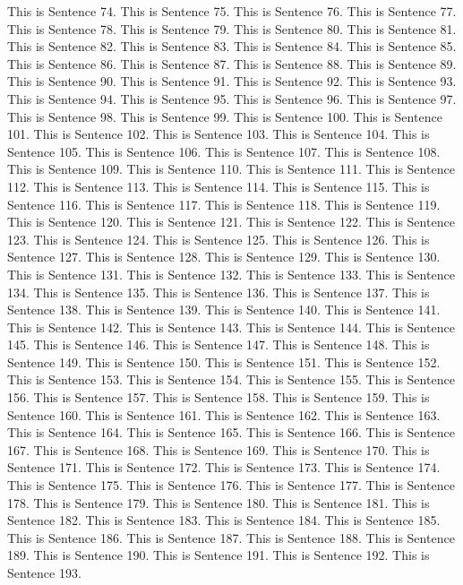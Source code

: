 \documentclass{article}
\begin{document}
This is Sentence 74.
This is Sentence 75.
This is Sentence 76.
This is Sentence 77.
This is Sentence 78.
This is Sentence 79.
This is Sentence 80.
This is Sentence 81.
This is Sentence 82.
This is Sentence 83.
This is Sentence 84.
This is Sentence 85.
This is Sentence 86.
This is Sentence 87.
This is Sentence 88.
This is Sentence 89.
This is Sentence 90.
This is Sentence 91.
This is Sentence 92.
This is Sentence 93.
This is Sentence 94.
This is Sentence 95.
This is Sentence 96.
This is Sentence 97.
This is Sentence 98.
This is Sentence 99.
This is Sentence 100.
This is Sentence 101.
This is Sentence 102.
This is Sentence 103.
This is Sentence 104.
This is Sentence 105.
This is Sentence 106.
This is Sentence 107.
This is Sentence 108.
This is Sentence 109.
This is Sentence 110.
This is Sentence 111.
This is Sentence 112.
This is Sentence 113.
This is Sentence 114.
This is Sentence 115.
This is Sentence 116.
This is Sentence 117.
This is Sentence 118.
This is Sentence 119.
This is Sentence 120.
This is Sentence 121.
This is Sentence 122.
This is Sentence 123.
This is Sentence 124.
This is Sentence 125.
This is Sentence 126.
This is Sentence 127.
This is Sentence 128.
This is Sentence 129.
This is Sentence 130.
This is Sentence 131.
This is Sentence 132.
This is Sentence 133.
This is Sentence 134.
This is Sentence 135.
This is Sentence 136.
This is Sentence 137.
This is Sentence 138.
This is Sentence 139.
This is Sentence 140.
This is Sentence 141.
This is Sentence 142.
This is Sentence 143.
This is Sentence 144.
This is Sentence 145.
This is Sentence 146.
This is Sentence 147.
This is Sentence 148.
This is Sentence 149.
This is Sentence 150.
This is Sentence 151.
This is Sentence 152.
This is Sentence 153.
This is Sentence 154.
This is Sentence 155.
This is Sentence 156.
This is Sentence 157.
This is Sentence 158.
This is Sentence 159.
This is Sentence 160.
This is Sentence 161.
This is Sentence 162.
This is Sentence 163.
This is Sentence 164.
This is Sentence 165.
This is Sentence 166.
This is Sentence 167.
This is Sentence 168.
This is Sentence 169.
This is Sentence 170.
This is Sentence 171.
This is Sentence 172.
This is Sentence 173.
This is Sentence 174.
This is Sentence 175.
This is Sentence 176.
This is Sentence 177.
This is Sentence 178.
This is Sentence 179.
This is Sentence 180.
This is Sentence 181.
This is Sentence 182.
This is Sentence 183.
This is Sentence 184.
This is Sentence 185.
This is Sentence 186.
This is Sentence 187.
This is Sentence 188.
This is Sentence 189.
This is Sentence 190.
This is Sentence 191.
This is Sentence 192.
This is Sentence 193.
\end{document}
